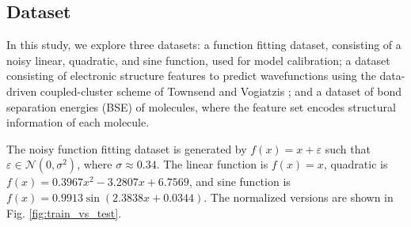 \documentclass[journal=jacsat,manuscript=article]{achemso}
\begin{document}
\subsection{Dataset}
In this study, we explore three datasets: a function fitting dataset, consisting of a noisy linear, quadratic, and sine function, used for model calibration; a dataset consisting of electronic structure features to predict wavefunctions using the data-driven coupled-cluster scheme of Townsend and Vogiatzis \cite{townsend_data-driven_2019}; and a dataset of bond separation energies (BSE) of molecules, where the feature set encodes structural information of each molecule. 

The noisy function fitting dataset is generated by
$f(x) = x + \varepsilon$ such that $\varepsilon \in \mathcal{N} (0, \sigma^{2} )$, where $\sigma\approx0.34$. The linear function is $f(x)=x$, quadratic is $f(x) = 0.3967 x^{2} - 3.2807 x + 6.7569$, and sine function is $f(x) = 0.9913 \sin(2.3838 x+0.0344)$. 
The normalized versions are shown in Fig. \ref{fig:train_vs_test}.
\end{document}
